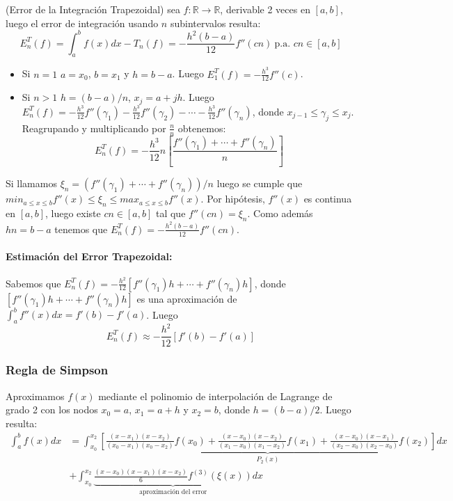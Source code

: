 \Teorema (Error de la Integración Trapezoidal) sea
\(f : \ensuremath{\mathbb{R}}\rightarrow \ensuremath{\mathbb{R}}\),
derivable 2 veces en \([a,b]\), luego el error de integración usando
\(n\) subintervalos resulta: \[
E_n^T(f) = \int_a^b f(x) dx - T_n (f) = - \frac{h^2(b-a)}{12} f''(cn)\ 
\text{p.a. } cn \in [a,b]
\]

\Demostracion 

\begin{itemize}
\item
  Si \(n = 1\) \implica \(a = x_0\), \(b = x_1\) y \(h = b-a\). Luego
  \(E_1^T(f) = - \frac{h^3}{12} f''(c)\).
\item
  Si \(n > 1\) \implica \(h = (b-a) / n\), \(x_j = a + jh\). Luego
  \(E_n^T(f) = - \frac{h^3}{12} f''(\gamma_1) - \frac{h^3}{12} f''(\gamma_2) - \cdots - \frac{h^3}{12} f''(\gamma_n)\),
  donde \(x_{j-1} \leq \gamma_j \leq x_j\). Reagrupando y multiplicando
  por \(\frac{n}{n}\) obtenemos: \[
  E_n^T(f) = - \frac{h^3}{12} n \left[ \frac{f''(\gamma_1) + \cdots +
  f''(\gamma_n)}{n} \right]
  \]
\end{itemize}

Si llamamos \(\xi_n = (f''(\gamma_1) + \cdots + f''(\gamma_n))/n\) luego
se cumple que
\(min_{a \leq x \leq b} f''(x) \leq \xi_n \leq max_{a \leq x \leq b} f''(x)\).
Por hipótesis, \(f''(x)\) es continua en \([a,b]\), luego existe
\(cn \in [a,b]\) tal que \(f''(cn) = \xi_n\). Como además \(hn = b - a\)
tenemos que \(E_n^T(f) = - \frac{h^2(b - a)}{12} f''(cn)\).

\hypertarget{estimaciuxf3n-del-error-trapezoidal}{%
\paragraph{Estimación del Error
Trapezoidal:}\label{estimaciuxf3n-del-error-trapezoidal}}

Sabemos que
\(E_n^T(f) = - \frac{h^2}{12} \left[f''(\gamma_1)h + \cdots + f''(\gamma_n)h \right]\),
donde \([f''(\gamma_1)h + \cdots + f''(\gamma_n)h]\) es una aproximación
de \(\int_a^b f''(x) dx = f'(b) - f'(a)\). Luego \[
E_n^T(f) \approx -\frac{h^2}{12}[f'(b) - f'(a)]
\]

\hypertarget{regla-de-simpson}{%
\subsubsection{Regla de Simpson}\label{regla-de-simpson}}

Aproximamos \(f(x)\) mediante el polinomio de interpolación de Lagrange
de grado 2 con los nodos \(x_0 = a\), \(x_1 = a + h\) y \(x_2 = b\),
donde \(h = (b-a)/2\). Luego resulta: \begin{align*}
\int_a^b f(x) dx 
&= \int_{x_0}^{x_2} \underbrace{\left[
\frac{(x-x_1)(x-x_2)}{(x_0-x_1)(x_0 - x_2)} f(x_0) 
+ \frac{(x-x_0)(x-x_2)}{(x_1-x_0)(x_1 - x_2)} f(x_1) 
+ \frac{(x-x_0)(x-x_1)}{(x_2-x_0)(x_2 - x_0)} f(x_2)
\right]}_{P_2(x)}  dx \\ 
&+ \int_{x_0}^{x_2} \underbrace{\frac{(x-x_0)(x-x_1)(x-x_2)}{6} 
f^{(3)}(\xi(x))}_{\text{aproximación del error}} dx
\end{align*}

